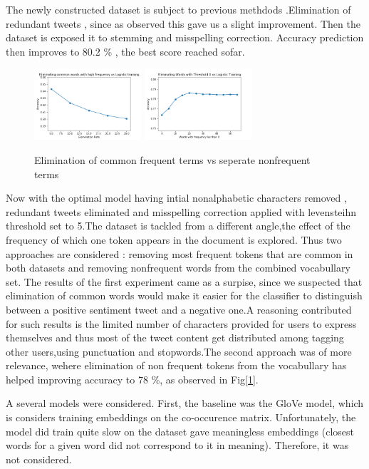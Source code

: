 \documentclass[10pt,conference,compsocconf]{IEEEtran}
\begin{document}
The newly constructed dataset is subject to previous methdods .Elimination of redundant tweets , since as observed this gave us a slight improvement. Then the dataset is exposed it to stemming and misspelling correction. Accuracy prediction then improves to 80.2 \% , the best score reached sofar.

\begin{figure}[!htb]
	\centering \includegraphics[width=150px]{../plots/commonElem.png}
	\centering \includegraphics[width=150px]{../plots/nonfrequent.png}
	\caption{Elimination of common frequent terms vs seperate nonfrequent terms}
	\label{freq}
\end{figure}
Now with the optimal model having intial nonalphabetic characters removed , redundant tweets eliminated and misspelling correction applied with levensteihn threshold set to 5.The dataset is tackled from a different angle,the effect of the frequency of which one token appears in the document is explored. Thus two approaches are considered : removing most frequent tokens that are common in both datasets and removing nonfrequent words from the combined vocabullary set. The results of the first experiment came as a surpise, since we suspected that elimination of common words would make it easier for the classifier to distinguish between a positive sentiment tweet and a negative one.A reasoning contributed for such results is the limited number of characters provided for users to express themselves and thus most of the tweet content get distributed among tagging other users,using punctuation and stopwords.The second approach was of more relevance, wehere elimination of non frequent tokens from the vocabullary has helped improving accuracy to 78 \%, as observed in Fig[\ref{freq}].    

A several models were considered. First, the baseline was the GloVe \cite{glove} model, which is considers training embeddings on the co-occurence matrix. Unfortunately, the model did train quite slow on the dataset gave meaningless embeddings (closest words for a given word did not correspond to it in meaning). Therefore, it was not considered.
\end{document}
